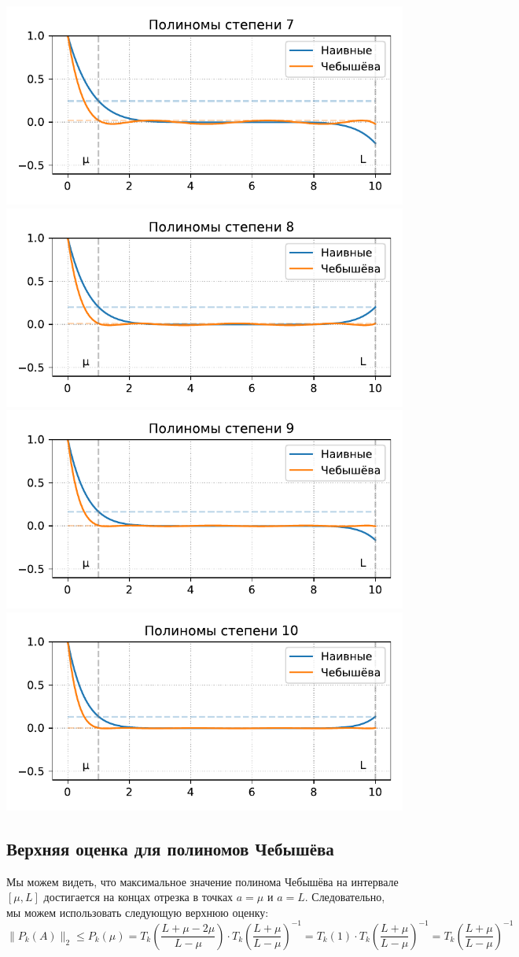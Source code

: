 \documentclass[
  russian,
  letterpaper,
  DIV=11,
  numbers=noendperiod]{scrartcl}
\begin{document}
\includegraphics[width=0.5\columnwidth,height=0.8\textheight,keepaspectratio]{gd_polynoms_7_ru.pdf}
\includegraphics[width=0.5\columnwidth,height=0.8\textheight,keepaspectratio]{gd_polynoms_8_ru.pdf}
\includegraphics[width=0.5\columnwidth,height=0.8\textheight,keepaspectratio]{gd_polynoms_9_ru.pdf}
\includegraphics[width=0.5\columnwidth,height=0.8\textheight,keepaspectratio]{gd_polynoms_10_ru.pdf}

\subsection{Верхняя оценка для полиномов
Чебышёва}\label{ux432ux435ux440ux445ux43dux44fux44f-ux43eux446ux435ux43dux43aux430-ux434ux43bux44f-ux43fux43eux43bux438ux43dux43eux43cux43eux432-ux447ux435ux431ux44bux448ux451ux432ux430}

Мы можем видеть, что максимальное значение полинома Чебышёва на
интервале \([\mu,L]\) достигается на концах отрезка в точках \(a=\mu\) и
\(a=L\). Следовательно, мы можем использовать следующую верхнюю оценку:
\[
\|P_k(A)\|_2 \le P_k(\mu) = T_k\left(\frac{L+\mu-2\mu}{L-\mu}\right) \cdot T_k\left(\frac{L+\mu}{L-\mu}\right)^{-1} = T_k\left(1\right) \cdot T_k\left(\frac{L+\mu}{L-\mu}\right)^{-1} = T_k\left(\frac{L+\mu}{L-\mu}\right)^{-1}
\]
\end{document}
